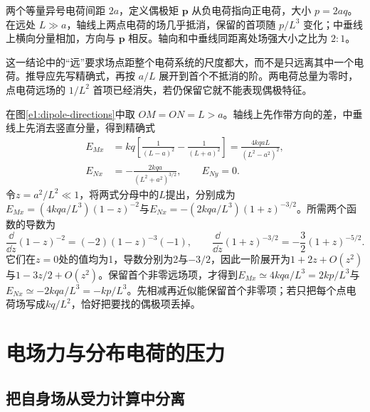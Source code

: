 两个等量异号电荷间距 $2a$，定义偶极矩 $\bm p$ 从负电荷指向正电荷，大小 $p=2aq$。在远处 $L\gg a$，轴线上两点电荷的场几乎抵消，保留的首项随 $p/L^3$ 变化；中垂线上横向分量相加，方向与 $\bm p$ 相反。轴向和中垂线同距离处场强大小之比为 $2:1$。

这一结论中的“远”要求场点距整个电荷系统的尺度都大，而不是只远离其中一个电荷。推导应先写精确式，再按 $a/L$ 展开到首个不抵消的阶。两电荷总量为零时，点电荷远场的 $1/L^2$ 首项已经消失，若仍保留它就不能表现偶极特征。



在图\ref{e1:dipole-directions}中取 $OM=ON=L>a$。轴线上先作带方向的差，中垂线上先消去竖直分量，得到精确式
\[
\begin{aligned}
E_{Mx}&=kq\left[\frac1{(L-a)^2}-\frac1{(L+a)^2}\right]
=\frac{4kqaL}{(L^2-a^2)^2},\\
E_{Nx}&=-\frac{2kqa}{(L^2+a^2)^{3/2}},\qquad E_{Ny}=0.
\end{aligned}
\]
令$z=a^2/L^2\ll1$，将两式分母中的$L$提出，分别成为$E_{Mx}=(4kqa/L^3)(1-z)^{-2}$与$E_{Nx}=-(2kqa/L^3)(1+z)^{-3/2}$。所需两个函数的导数为
\[
\frac{\dd}{\dd z}(1-z)^{-2}=(-2)(1-z)^{-3}(-1),\qquad
\frac{\dd}{\dd z}(1+z)^{-3/2}=-\frac32(1+z)^{-5/2}.
\]
它们在$z=0$处的值均为1，导数分别为2与$-3/2$，因此一阶展开为$1+2z+O(z^2)$与$1-3z/2+O(z^2)$。保留首个非零远场项，才得到$E_{Mx}\simeq4kqa/L^3=2kp/L^3$与$E_{Nx}\simeq-2kqa/L^3=-kp/L^3$。先相减再近似能保留首个非零项；若只把每个点电荷场写成$kq/L^2$，恰好把要找的偶极项丢掉。

\section{电场力与分布电荷的压力}
\subsection{把自身场从受力计算中分离}

